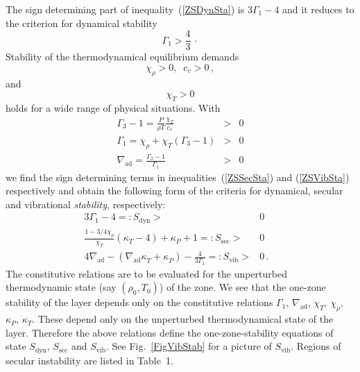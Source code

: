 \documentclass{aa}
\begin{document}
   The sign determining part of inequality~(\ref{ZSDynSta}) is
   $3\Gamma_1 - 4$ and it reduces to the
   criterion for dynamical stability
   \begin{equation}
     \Gamma_1 > \frac{4}{3}\,\cdot
   \end{equation}
   Stability of the thermodynamical equilibrium demands
   \begin{equation}
      \chi^{}_\rho > 0, \;\;  c_v > 0\, ,
   \end{equation}
   and
   \begin{equation}
      \chi^{}_T > 0
   \end{equation}
   holds for a wide range of physical situations.
   With
   \begin{eqnarray}
      \Gamma_3 - 1 = \frac{P}{\rho T} \frac{\chi^{}_T}{c_v}&>&0\\
      \Gamma_1     = \chi_\rho^{} + \chi_T^{} (\Gamma_3 -1)&>&0\\
      \nabla_{\mathrm{ad}}  = \frac{\Gamma_3 - 1}{\Gamma_1}         &>&0
   \end{eqnarray}
   we find the sign determining terms in inequalities~(\ref{ZSSecSta})
   and (\ref{ZSVibSta}) respectively and obtain the following form
   of the criteria for dynamical, secular and vibrational
   \emph{stability}, respectively:
   \begin{eqnarray}
      3 \Gamma_1 - 4 =: S_{\mathrm{dyn}}      > & 0 & \label{DynSta}  \\
%
      \frac{ 1- 3/4 \chi^{}_\rho }{ \chi^{}_T } ( \kappa^{}_T - 4 )
         + \kappa^{}_P + 1 =: S_{\mathrm{sec}} > & 0 & \label{SecSta} \\
%
      4 \nabla_{\mathrm{ad}} - (\nabla_{\mathrm{ad}} \kappa^{}_T
                             + \kappa^{}_P)
                             - \frac{4}{3 \Gamma_1} =: S_{\mathrm{vib}}
                                      > & 0\,.& \label{VibSta}
   \end{eqnarray}
   The constitutive relations are to be evaluated for the
   unperturbed thermodynamic state (say $(\rho_0, T_0)$) of the zone.
   We see that the one-zone stability of the layer depends only on
   the constitutive relations $\Gamma_1$,
   $\nabla_{\mathrm{ad}}$, $\chi_T^{},\,\chi_\rho^{}$,
   $\kappa_P^{},\,\kappa_T^{}$.
   These depend only on the unperturbed
   thermodynamical state of the layer. Therefore the above relations
   define the one-zone-stability equations of state
   $S_{\mathrm{dyn}},\,S_{\mathrm{sec}}$
   and $S_{\mathrm{vib}}$. See Fig.~\ref{FigVibStab} for a picture of
   $S_{\mathrm{vib}}$. Regions of secular instability are
   listed in Table~1.
\end{document}
